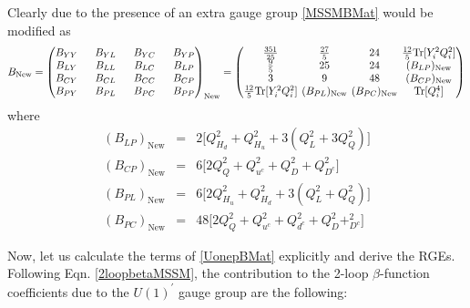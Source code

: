\documentclass[11pt,prd,superscriptaddress,nofootinbib]{revtex4-1}
\numberwithin{equation}{section}
\newcommand{\uonep}{\ensuremath{U(1)^\prime}}
\newcommand{\be}{\begin{equation}}
\newcommand{\ee}{\end{equation}}
\newcommand{\bea}{\begin{eqnarray}}
\newcommand{\eea}{\end{eqnarray}}
\def\b{\beta}
\begin{document}
Clearly due to the presence of an extra gauge group \ref{MSSMBMat} would be modified as
\be \label{UonepBMat}
B_{\mathrm{New}}=\begin{pmatrix}B_{YY}&
~~B_{YL}& ~~B_{YC}& ~~B_{YP}\cr B_{LY} & ~~B_{LL}& ~~B_{LC} & ~~B_{LP} \cr
B_{CY} & ~~B_{CL} & ~~B_{CC} & ~~B_{CP} \cr
B_{PY} & ~~B_{PL} & ~~B_{PC} & ~~B_{PP}  \end{pmatrix}_{\mathrm{New}}=\setlength\arraycolsep{2pt}
\begin{pmatrix}\frac{351}{25}&\frac{27}{5}
& 24 & \frac{12}{5}\mathrm{Tr}[Y_i^2Q_i^2]\cr \frac{9}{5} & 25 & 24 & (B_{LP})_{\mathrm{New}} \cr
3 & 9 & 48 & (B_{CP})_{\mathrm{New}} \cr
\frac{12}{5}\mathrm{Tr}[Y_i^2Q_i^2] & (B_{PL})_{\mathrm{New}}  & (B_{PC})_{\mathrm{New}} & \mathrm{Tr}[Q_i^4]  \end{pmatrix}
\ee
where
\bea
(B_{LP})_{\mathrm{New}} &=& 2\big[Q_{H_d}^2+Q_{H_u}^2+3(Q_L^2+3Q_Q^2)\big]\\
(B_{CP})_{\mathrm{New}} &=& 6\big[2Q_Q^2+Q_{u^c}^2+Q_D^2+Q_{D^c}^2\big]\\
(B_{PL})_{\mathrm{New}} &=& 6\big[2Q_{H_u}^2+Q_{H_d}^2+3(Q_L^2+Q_Q^2)\big]\\
(B_{PC})_{\mathrm{New}} &=& 48\big[2Q_Q^2+Q_{u^c}^2+Q_{d^c}^2+Q_D^2+_{D^c}^2\big]
\eea

Now, let us calculate the terms of \ref{UonepBMat} explicitly and derive the RGEs. Following Eqn. \ref{2loopbetaMSSM}, the contribution to the 2-loop $\b$-function coefficients due to the $\uonep$ gauge group are the following:
\end{document}
